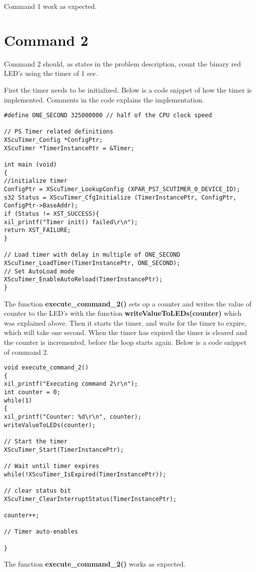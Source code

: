 Command 1 work as expected. 

\section{Command 2}

Command 2 should, as states in the problem description, count the binary red LED's using the timer of 1 sec. 

First the timer needs to be initialized. Below is a code snippet of how the timer is implemented. Comments in the code explains the implementation.

\begin{lstlisting}
#define ONE_SECOND 325000000 // half of the CPU clock speed

// PS Timer related definitions
XScuTimer_Config *ConfigPtr;
XScuTimer *TimerInstancePtr = &Timer;

int main (void) 
{
//initialize timer
ConfigPtr = XScuTimer_LookupConfig (XPAR_PS7_SCUTIMER_0_DEVICE_ID);
s32 Status = XScuTimer_CfgInitialize (TimerInstancePtr, ConfigPtr, ConfigPtr->BaseAddr);
if (Status != XST_SUCCESS){
xil_printf("Timer init() failed\r\n");
return XST_FAILURE;
}

// Load timer with delay in multiple of ONE_SECOND
XScuTimer_LoadTimer(TimerInstancePtr, ONE_SECOND);
// Set AutoLoad mode
XScuTimer_EnableAutoReload(TimerInstancePtr);
}

\end{lstlisting}

The function \textbf{execute\_command\_2()} sets op a counter and writes the value of counter to the LED's with the function \textbf{writeValueToLEDs(counter)} which was explained above. Then it starts the timer, and waits for the timer to expire, which will take one second. When the timer has expired the timer is cleared and the counter is incremented, before the loop starts again. Below is a code snippet of command 2. 

\begin{lstlisting}
void execute_command_2()
{
xil_printf("Executing command 2\r\n");
int counter = 0;
while(1)
{
xil_printf("Counter: %d\r\n", counter);
writeValueToLEDs(counter);

// Start the timer
XScuTimer_Start(TimerInstancePtr);

// Wait until timer expires
while(!XScuTimer_IsExpired(TimerInstancePtr));

// clear status bit
XScuTimer_ClearInterruptStatus(TimerInstancePtr);

counter++;

// Timer auto-enables

}
\end{lstlisting}

The function \textbf{execute\_command\_2()} works as expected. 

